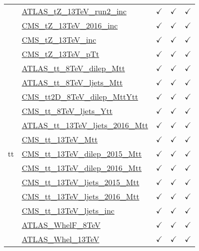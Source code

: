 \documentclass{article}
\begin{document}
\begin{longtable}{|c|l|c|c|c|}
 & \href{https://arxiv.org}{ATLAS_tZ_13TeV_run2_inc}  & $\checkmark$ & $\checkmark$ & $\checkmark$\\ \cline{2-5}
 & \href{https://arxiv.org}{CMS_tZ_13TeV_2016_inc}  & $\checkmark$ & $\checkmark$ & $\checkmark$\\ \cline{2-5}
 & \href{https://arxiv.org}{CMS_tZ_13TeV_inc}  & $\checkmark$ & $\checkmark$ & $\checkmark$\\ \cline{2-5}
 & \href{https://arxiv.org}{CMS_tZ_13TeV_pTt}  & $\checkmark$ & $\checkmark$ & $\checkmark$
\\ \hline
\multirow{17}{*}{tt}
 & \href{https://arxiv.org}{ATLAS_tt_8TeV_dilep_Mtt}  & $\checkmark$ & $\checkmark$ & $\checkmark$\\ \cline{2-5}
 & \href{https://arxiv.org}{ATLAS_tt_8TeV_ljets_Mtt}  & $\checkmark$ & $\checkmark$ & $\checkmark$\\ \cline{2-5}
 & \href{https://arxiv.org}{CMS_tt2D_8TeV_dilep_MttYtt}  & $\checkmark$ & $\checkmark$ & $\checkmark$\\ \cline{2-5}
 & \href{https://arxiv.org}{CMS_tt_8TeV_ljets_Ytt}  & $\checkmark$ & $\checkmark$ & $\checkmark$\\ \cline{2-5}
 & \href{https://arxiv.org}{ATLAS_tt_13TeV_ljets_2016_Mtt}  & $\checkmark$ & $\checkmark$ & $\checkmark$\\ \cline{2-5}
 & \href{https://arxiv.org}{CMS_tt_13TeV_Mtt}  & $\checkmark$ & $\checkmark$ & $\checkmark$\\ \cline{2-5}
 & \href{https://arxiv.org}{CMS_tt_13TeV_dilep_2015_Mtt}  & $\checkmark$ & $\checkmark$ & $\checkmark$\\ \cline{2-5}
 & \href{https://arxiv.org}{CMS_tt_13TeV_dilep_2016_Mtt}  & $\checkmark$ & $\checkmark$ & $\checkmark$\\ \cline{2-5}
 & \href{https://arxiv.org}{CMS_tt_13TeV_ljets_2015_Mtt}  & $\checkmark$ & $\checkmark$ & $\checkmark$\\ \cline{2-5}
 & \href{https://arxiv.org}{CMS_tt_13TeV_ljets_2016_Mtt}  & $\checkmark$ & $\checkmark$ & $\checkmark$\\ \cline{2-5}
 & \href{https://arxiv.org}{CMS_tt_13TeV_ljets_inc}  & $\checkmark$ & $\checkmark$ & $\checkmark$\\ \cline{2-5}
 & \href{https://arxiv.org}{ATLAS_WhelF_8TeV}  & $\checkmark$ & $\checkmark$ & $\checkmark$\\ \cline{2-5}
 & \href{https://arxiv.org}{ATLAS_Whel_13TeV}  & $\checkmark$ & $\checkmark$ & $\checkmark$\\ \cline{2-5}

\end{longtable}
\end{document}
